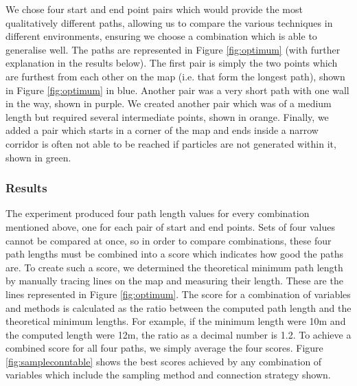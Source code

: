\documentclass[conference]{IEEEtran}
\begin{document}
We chose four start and end point pairs which would provide the most qualitatively different paths, allowing us to compare the various techniques in different environments, ensuring we choose a combination which is able to generalise well. The paths are represented in Figure \ref{fig:optimum} (with further explanation in the results below). The first pair is simply the two points which are furthest from each other on the map (i.e. that form the longest path), shown in Figure \ref{fig:optimum} in blue. Another pair was a very short path with one wall in the way, shown in purple. We created another pair which was of a medium length but required several intermediate points, shown in orange. Finally, we added a pair which starts in a corner of the map and ends inside a narrow corridor is often not able to be reached if particles are not generated within it, shown in green.
\subsubsection{Results}
The experiment produced four path length values for every combination mentioned above, one for each pair of start and end points. Sets of four values cannot be compared at once, so in order to compare combinations, these four path lengths must be combined into a score which indicates how good the paths are. To create such a score, we determined the theoretical minimum path length by manually tracing lines on the map and measuring their length. These are the lines represented in Figure \ref{fig:optimum}. The score for a combination of variables and methods is calculated as the ratio between the computed path length and the theoretical minimum lengths. For example, if the minimum length were 10m and the computed length were 12m, the ratio as a decimal number is 1.2. To achieve a combined score for all four paths, we simply average the four scores. Figure \ref{fig:sampleconntable} shows the best scores achieved by any combination of variables which include the sampling method and connection strategy shown.
\end{document}
